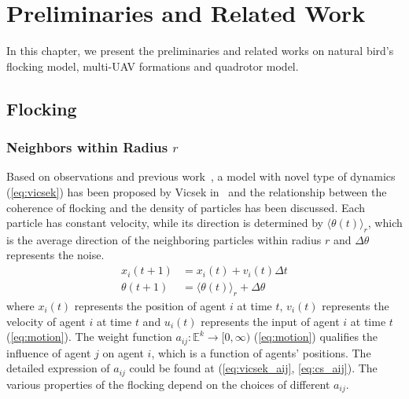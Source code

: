\chapter{Preliminaries and Related Work}\label{preliminaries}

In this chapter, we present the preliminaries and related works on natural bird's flocking model, multi-UAV formations and quadrotor model.

\section{Flocking}\label{flocking}

\subsection{Neighbors within Radius $r$}

Based on observations and previous work~\cite{Reynolds1987}, a model with novel type of dynamics (\ref{eq:vicsek}) has been proposed by Vicsek in~\cite{Vicsek1995} and the relationship between the coherence of flocking and the density of particles has been discussed. Each particle has constant velocity, while its direction is determined by ${\langle\theta(t)\rangle}_r$, which is the average direction of the neighboring particles within radius $r$ and $\Delta\theta$ represents the noise.
\begin{equation}\label{eq:vicsek}
\begin{aligned}
x_i(t+1)&=x_i(t)+v_i(t)\Delta t\\
\theta(t+1)&={\langle\theta(t)\rangle}_r+\Delta\theta
\end{aligned}
\end{equation}
where $x_i(t)$ represents the position of agent $i$ at time $t$, $v_i(t)$ represents the velocity of agent $i$ at time $t$ and $u_i(t)$ represents the input of agent $i$ at time $t$ (\ref{eq:motion}). The weight function $a_{ij}:\mathbb{E}^k\to[0,\infty)$ (\ref{eq:motion}) qualifies the influence of agent $j$ on agent $i$, which is a function of agents' positions. The detailed expression of $a_{ij}$ could be found at (\ref{eq:vicsek_aij}, \ref{eq:cs_aij}). The various properties of the flocking depend on the choices of different $a_{ij}$.

